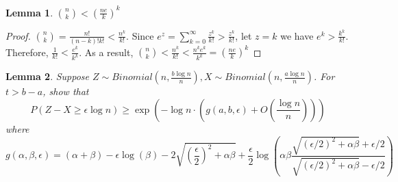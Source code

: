 \documentclass{article}
\newtheorem{lemma}{Lemma}
\begin{document}
\begin{lemma}\label{lem:nk}
	$\binom{n}{k} < (\frac{ne}{k})^k$
\end{lemma}
\begin{proof}
	$\binom{n}{k} = \frac{n!}{(n-k)!k!} < \frac{n^k}{k!}$.
	Since $e^z = \sum_{k=0}^{\infty} \frac{z^k}{k!} > \frac{z^k}{k!}$,
	let $z=k$ we have $e^k > \frac{k^k}{k!}$.
	Therefore, $\frac{1}{k!} < \frac{e^k}{k^k}$.
	As a result, $\binom{n}{k}  < \frac{n^k}{k!} < \frac{n^k e^k}{k^k}
	= (\frac{ne}{k})^k$
\end{proof}


\begin{lemma}
	Suppose $Z \sim Binomial(n, \frac{b\log n}{n}), X\sim Binomial(n, \frac{a\log n}{n})$.
	For $ t > b - a$, show that
	\begin{equation}
	P(Z - X \geq \epsilon \log n) \geq \exp(-\log n \cdot ( g(a, b, \epsilon) + O(\frac{\log n}{n})))
	\end{equation}
	where
	\begin{equation}\label{eq:galphabeta}
	g(\alpha,\beta,\epsilon)= (\alpha+\beta)-\epsilon \log(\beta) - 2\sqrt{\left( \frac{\epsilon}{2}\right)^2 +\alpha \beta} +\frac{\epsilon}{2} \log \left( \alpha \beta \frac{\sqrt{(\epsilon/2)^2 +\alpha \beta} +\epsilon/2}{\sqrt{(\epsilon/2)^2 +\alpha \beta} -\epsilon/2} \right)
	\end{equation}
\end{lemma}
\end{document}
